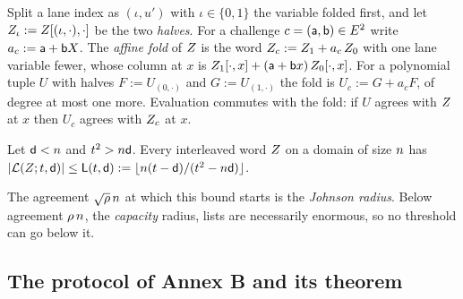 \begin{definition}\label{def:fold}
Split a lane index as $(\iota,u')$ with $\iota\in\{0,1\}$ the variable folded first, and let $Z_\iota:=Z[(\iota,\cdot),\cdot]$ be the two \emph{halves}. For a challenge $c=(\mathsf{a},\mathsf{b})\in E^2$ write $a_c:=\mathsf{a}+\mathsf{b} X$. The \emph{affine fold} of $Z$ is the word $Z_c:=Z_1+a_c\,Z_0$ with one lane variable fewer, whose column at $x$ is $Z_1[\cdot,x]+(\mathsf{a}+\mathsf{b} x)\,Z_0[\cdot,x]$. For a polynomial tuple $U$ with halves $F:=U_{(0,\cdot)}$ and $G:=U_{(1,\cdot)}$ the fold is $U_c:=G+a_cF$, of degree at most one more. Evaluation commutes with the fold: if $U$ agrees with $Z$ at $x$ then $U_c$ agrees with $Z_c$ at $x$.
\end{definition}

\begin{theorem}\label{thm:johnson}
Let $\mathsf{d}<n$ and $t^2>n\mathsf{d}$. Every interleaved word $Z$ on a domain of size $n$ has $|\mathcal{L}(Z;t,\mathsf{d})|\le\mathsf{L}(t,\mathsf{d}):=\lfloor n(t-\mathsf{d})/(t^2-n\mathsf{d})\rfloor$.
\end{theorem}

The agreement $\sqrt{\rho}\,n$ at which this bound starts is the \emph{Johnson radius}. Below agreement $\rho\,n$, the \emph{capacity} radius, lists are necessarily enormous, so no threshold can go below it.

\subsection{The protocol of Annex B and its theorem}\label{sec:annexb}

